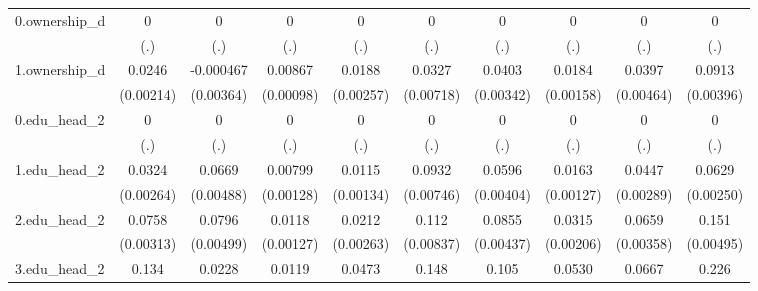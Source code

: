 \begin{table}[htbp]
{\begin{tabular}{l*{9}{c}}
0.ownership_d&           0         &           0         &           0         &           0         &           0         &           0         &           0         &           0         &           0         \\
            &         (.)         &         (.)         &         (.)         &         (.)         &         (.)         &         (.)         &         (.)         &         (.)         &         (.)         \\
1.ownership_d&      0.0246\sym{***}&   -0.000467         &     0.00867\sym{***}&      0.0188\sym{***}&      0.0327\sym{***}&      0.0403\sym{***}&      0.0184\sym{***}&      0.0397\sym{***}&      0.0913\sym{***}\\
            &   (0.00214)         &   (0.00364)         &   (0.00098)         &   (0.00257)         &   (0.00718)         &   (0.00342)         &   (0.00158)         &   (0.00464)         &   (0.00396)         \\
0.edu_head_2&           0         &           0         &           0         &           0         &           0         &           0         &           0         &           0         &           0         \\
            &         (.)         &         (.)         &         (.)         &         (.)         &         (.)         &         (.)         &         (.)         &         (.)         &         (.)         \\
1.edu_head_2&      0.0324\sym{***}&      0.0669\sym{***}&     0.00799\sym{***}&      0.0115\sym{***}&      0.0932\sym{***}&      0.0596\sym{***}&      0.0163\sym{***}&      0.0447\sym{***}&      0.0629\sym{***}\\
            &   (0.00264)         &   (0.00488)         &   (0.00128)         &   (0.00134)         &   (0.00746)         &   (0.00404)         &   (0.00127)         &   (0.00289)         &   (0.00250)         \\
2.edu_head_2&      0.0758\sym{***}&      0.0796\sym{***}&      0.0118\sym{***}&      0.0212\sym{***}&       0.112\sym{***}&      0.0855\sym{***}&      0.0315\sym{***}&      0.0659\sym{***}&       0.151\sym{***}\\
            &   (0.00313)         &   (0.00499)         &   (0.00127)         &   (0.00263)         &   (0.00837)         &   (0.00437)         &   (0.00206)         &   (0.00358)         &   (0.00495)         \\
3.edu_head_2&       0.134\sym{***}&      0.0228\sym{***}&      0.0119\sym{***}&      0.0473\sym{***}&       0.148\sym{***}&       0.105\sym{***}&      0.0530\sym{***}&      0.0667\sym{***}&       0.226\sym{***}\\

\end{tabular}}
\end{table}
